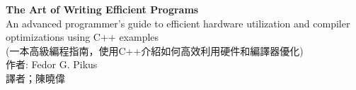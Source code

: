\documentclass[11pt,a4paper,UTF8]{book}
\begin{document}

\begin{center}
\thispagestyle{empty}
\newpage
\thispagestyle{empty}
\huge
\textbf{The Art of Writing Efficient Programs} 
\\[9pt]
\normalsize
An advanced programmer's guide to efficient hardware utilization and compiler optimizations using C++ examples \\ 
(一本高級編程指南，使用C++介紹如何高效利用硬件和編譯器優化)
\\[10pt]
\normalsize 
作者: Fedor G. Pikus
\\[8pt]
\normalsize
譯者；陳曉偉
\end{center}
\end{document}
